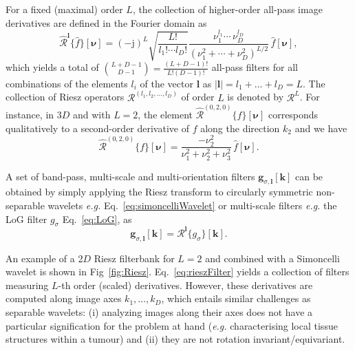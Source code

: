 \documentclass[fleqn,a4paper,oneside,openany]{book}
\begin{document}
For a fixed (maximal) order $L$, the collection of higher-order all-pass image derivatives are defined in the Fourier domain as
%
\begin{equation}\label{eq:RieszTransformHigherOrder}
\widehat{\boldsymbol{\mathcal{R}}}^{\boldsymbol{l}}\{\hat{f}\}[\boldsymbol{\nu}]=
(-\mathrm{j})^L
\sqrt{\frac{L!}{l_1!\cdots l_D!}}
\frac{\nu_1^{l_1}\cdots\,\nu_D^{l_D}}
{\left( \nu_1^2+\cdots+\nu_D^2 \right)^{L/2}}
\,\hat{f}[\boldsymbol{\nu}],
\end{equation}
%
which yields a total of ${{L+D-1}\choose{D-1}}=\frac{(L+D-1)!}{L!(D-1)!}$ all-pass filters for all combinations of the elements $l_i$ of the vector $\boldsymbol{l}$ as $|\boldsymbol{l}|=l_1+\dots+l_D=L$.
The collection of Riesz operators $\boldsymbol{\mathcal{R}}^{(l_1,l_2,\dots,l_D)}$ of order $L$ is denoted by $\boldsymbol{\mathcal{R}}^L$.
For instance, in 3$D$ and with $L=2$, the element $\widehat{\mathcal{R}}^{(0,2,0)}\{f\}[\boldsymbol{\nu}]$ corresponds qualitatively to a second-order derivative of $f$ along the direction $k_2$ and we have $$\widehat{\mathcal{R}}^{(0,2,0)}\{f\}[\boldsymbol{\nu}]=
\frac{-\nu_2^{2}}
{\nu_1^2+\nu_2^2+\nu_3^2}
\,\hat{f}[\boldsymbol{\nu}].$$

A set of band-pass, multi-scale and multi-orientation filters $\boldsymbol{g}_{\sigma,\boldsymbol{l}}[\boldsymbol{k}]$ can be obtained by simply applying the Riesz transform to circularly symmetric non-separable wavelets \textit{e.g.} Eq.~\eqref{eq:simoncelliWavelet} or multi-scale filters \textit{e.g.} the LoG filter $g_{\sigma}$ Eq.~\eqref{eq:LoG}, as
%
\begin{equation}\label{eq:rieszFilter}
\boldsymbol{g}_{\sigma,\boldsymbol{l}}[\boldsymbol{k}] = 
\boldsymbol{\mathcal{R}}^{\boldsymbol{l}}
\{g_{\sigma}\}[\boldsymbol{k}].
\end{equation}

An example of a 2$D$ Riesz filterbank for $L=2$ and combined with a Simoncelli wavelet is shown in Fig~\ref{fig:Riesz}.
Eq.~\eqref{eq:rieszFilter} yields a collection of filters measuring $L$-th order (scaled) derivatives. However, these derivatives are computed along image axes $k_1,\dots,k_D$, which entails similar challenges as separable wavelets: (i) analyzing images along their axes does not have a particular signification for the problem at hand (\textit{e.g.} characterising local tissue structures within a tumour) and (ii) they are not rotation invariant/equivariant.
\end{document}
